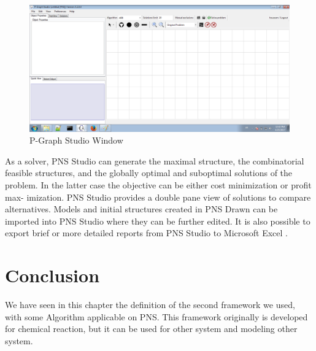 \begin{figure}[th]
	\centering %
 	\includegraphics[scale=0.44]{ch3/img/pgraph}
	\caption{\label{fig:pgraphstudio)}P-Graph Studio Window}
\end{figure} 

As a solver, PNS Studio can generate the maximal structure, the combinatorial feasible structures, and the globally optimal
and suboptimal solutions of the problem. In the latter case the objective can be either cost minimization or profit max-
imization. PNS Studio provides a double pane view of solutions to compare alternatives.
Models and initial structures created in PNS Drawn can be imported into PNS Studio where they can be further edited. It
is also possible to export brief or more detailed reports from PNS Studio to Microsoft Excel \cite{ch3-pgraph}.
 
 
\section{Conclusion}
We have seen in this chapter the definition of the second framework we used, with some Algorithm applicable on PNS. This framework originally is developed for chemical reaction, but it can be used for other system and modeling other system.

